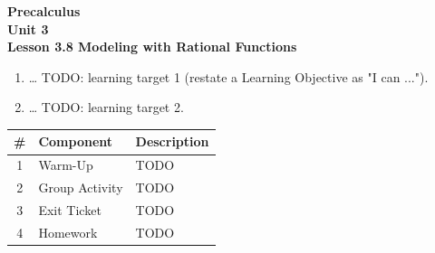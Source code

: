 \documentclass[10pt]{article}
\begin{document}
\vspace{-0.8in}

\begin{center}
  {\color{white}\textbf{\LARGE Precalculus}}\\[4pt]
  {\color{skymid}\large\textbf{Unit 3}}\\[6pt]
  {\color{white}\textbf{\large Lesson 3.8 \quad Modeling with Rational Functions}}
\end{center}

\vspace{0.22in}
\namedateperiod
\vspace{0.18in}

\begin{learningtargetbox}
\small
\begin{enumerate}[leftmargin=1.5em, itemsep=5pt]
  \item \ldots{} TODO: learning target 1 (restate a Learning Objective as "I can ...").
  \item \ldots{} TODO: learning target 2.
\end{enumerate}
\end{learningtargetbox}

\vspace{0.14in}

\begin{tocbox}
\small
\renewcommand{\arraystretch}{1.5}
\begin{tabularx}{\linewidth}{@{} c l X @{}}
\rowcolor{sky}
\textbf{\#} & \textbf{Component} & \textbf{Description} \\
\midrule
1 & Warm-Up      & TODO \\
2 & Group Activity & TODO \\
3 & Exit Ticket  & TODO \\
4 & Homework     & TODO \\
\end{tabularx}
\end{tocbox}
\end{document}
